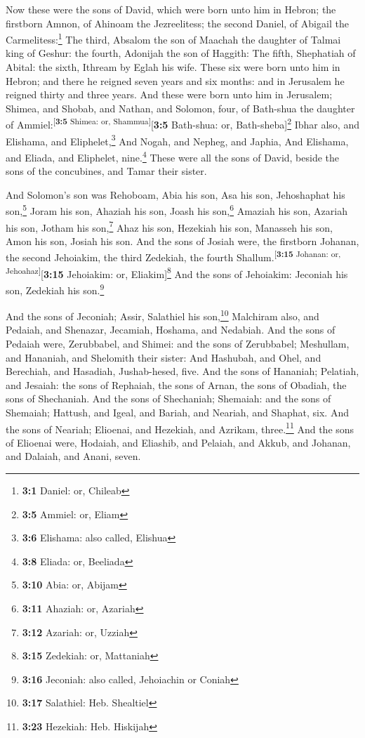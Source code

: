 Now these were the sons of David, which were born unto
him in Hebron; the firstborn Amnon, of Ahinoam the Jezreelitess; the
second Daniel, of Abigail the Carmelitess:\footnote{\textbf{3:1} Daniel:
  or, Chileab}  The third, Absalom the son of Maachah the
daughter of Talmai king of Geshur: the fourth, Adonijah the son of
Haggith:  The fifth, Shephatiah of Abital: the sixth,
Ithream by Eglah his wife.  These six were born unto him
in Hebron; and there he reigned seven years and six months: and in
Jerusalem he reigned thirty and three years.  And these
were born unto him in Jerusalem; Shimea, and Shobab, and Nathan, and
Solomon, four, of Bath-shua the daughter of
Ammiel:\textsuperscript{{[}\textbf{3:5} Shimea: or,
Shammua{]}}{[}\textbf{3:5} Bath-shua: or, Bath-sheba{]}\footnote{\textbf{3:5}
  Ammiel: or, Eliam}  Ibhar also, and Elishama, and
Eliphelet,\footnote{\textbf{3:6} Elishama: also called, Elishua}
 And Nogah, and Nepheg, and Japhia,  And
Elishama, and Eliada, and Eliphelet, nine.\footnote{\textbf{3:8} Eliada:
  or, Beeliada}  These were all the sons of David, beside
the sons of the concubines, and Tamar their sister.

 And Solomon's son was Rehoboam, Abia his son, Asa his
son, Jehoshaphat his son,\footnote{\textbf{3:10} Abia: or, Abijam}
 Joram his son, Ahaziah his son, Joash his
son,\footnote{\textbf{3:11} Ahaziah: or, Azariah} 
Amaziah his son, Azariah his son, Jotham his son,\footnote{\textbf{3:12}
  Azariah: or, Uzziah}  Ahaz his son, Hezekiah his son,
Manasseh his son,  Amon his son, Josiah his son.
 And the sons of Josiah were, the firstborn Johanan, the
second Jehoiakim, the third Zedekiah, the fourth
Shallum.\textsuperscript{{[}\textbf{3:15} Johanan: or,
Jehoahaz{]}}{[}\textbf{3:15} Jehoiakim: or, Eliakim{]}\footnote{\textbf{3:15}
  Zedekiah: or, Mattaniah}  And the sons of Jehoiakim:
Jeconiah his son, Zedekiah his son.\footnote{\textbf{3:16} Jeconiah:
  also called, Jehoiachin or Coniah}

 And the sons of Jeconiah; Assir, Salathiel his
son,\footnote{\textbf{3:17} Salathiel: Heb. Shealtiel} 
Malchiram also, and Pedaiah, and Shenazar, Jecamiah, Hoshama, and
Nedabiah.  And the sons of Pedaiah were, Zerubbabel, and
Shimei: and the sons of Zerubbabel; Meshullam, and Hananiah, and
Shelomith their sister:  And Hashubah, and Ohel, and
Berechiah, and Hasadiah, Jushab-hesed, five.  And the
sons of Hananiah; Pelatiah, and Jesaiah: the sons of Rephaiah, the sons
of Arnan, the sons of Obadiah, the sons of Shechaniah. 
And the sons of Shechaniah; Shemaiah: and the sons of Shemaiah; Hattush,
and Igeal, and Bariah, and Neariah, and Shaphat, six. 
And the sons of Neariah; Elioenai, and Hezekiah, and Azrikam,
three.\footnote{\textbf{3:23} Hezekiah: Heb. Hiskijah} 
And the sons of Elioenai were, Hodaiah, and Eliashib, and Pelaiah, and
Akkub, and Johanan, and Dalaiah, and Anani, seven.

